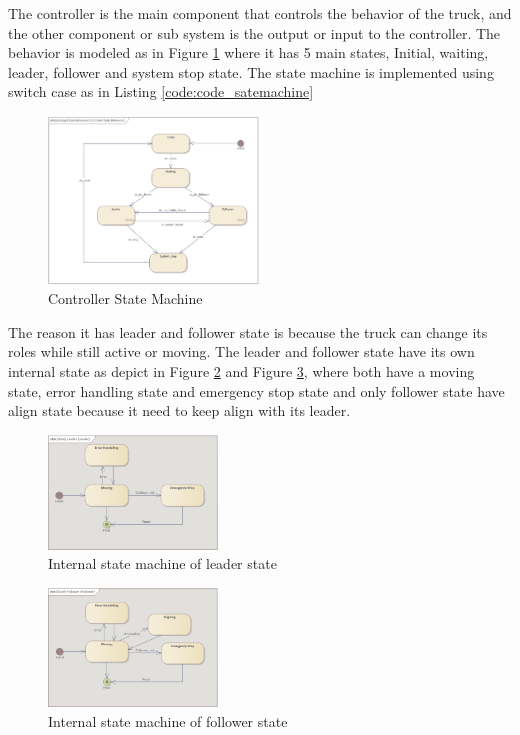 The controller is the main component that controls the behavior of the truck, and the other component or sub system is the output or input to the controller. The behavior is modeled as in Figure \ref{img:controller_state_machine} where it has 5 main states, Initial, waiting, leader, follower and system stop state. The state machine is implemented using switch case as in Listing \ref{code:code_satemachine}

\begin{figure}[ht]
    \centering
    \includegraphics[width=0.5\textwidth]{images/controller_state_machine.png}
    \caption{Controller State Machine}
    \label{img:controller_state_machine}
\end{figure}

The reason it has leader and follower state is because the truck can change its roles while still active or moving. The leader and follower state have its own internal state as depict in Figure \ref{img:leader_state_machine} and Figure \ref{img:follower_state_machine}, where both have a moving state, error handling state and emergency stop state and only follower state have align state because it need to keep align with its leader.

\begin{figure}[ht]
    \centering
    \includegraphics[width=0.4\textwidth]{images/leader_state_machine.png}
    \caption{Internal state machine of leader state}
    \label{img:leader_state_machine}
\end{figure}


\begin{figure}[ht]
    \centering
    \includegraphics[width=0.4\textwidth]{images/follower_state_machine.png}
    \caption{ Internal state machine of follower state }
    \label{img:follower_state_machine}
\end{figure}

